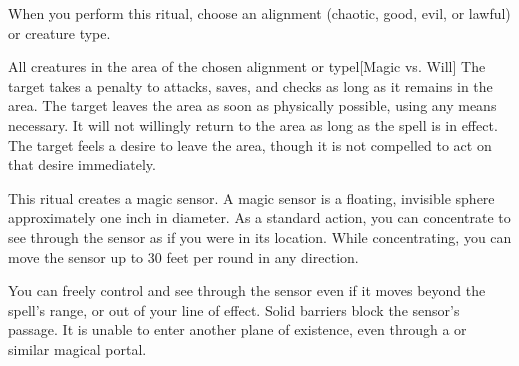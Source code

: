 \spellspecial When you perform this ritual, choose an alignment (chaotic, good, evil, or lawful) or creature type.
\begin{spelltargets}{All creatures in the area of the chosen alignment or type}l[Magic vs. Will]
    \spelleffect The target takes a  penalty to attacks, saves, and checks as long as it remains in the area.
    \spellsuccess The target leaves the area as soon as physically possible, using any means necessary. It will not willingly return to the area as long as the spell is in effect.
    \spellfailure The target feels a desire to leave the area, though it is not compelled to act on that desire immediately.
\end{spelltargets}

\spellrng{\rngmed}
\spelldur{\durlong \dismissable}
\spellline
\spelleffect This ritual creates a magic sensor. A magic sensor is a floating, invisible sphere approximately one inch in diameter. As a standard action, you can concentrate to see through the sensor as if you were in its location. While concentrating, you can move the sensor up to 30 feet per round in any direction.

You can freely control and see through the sensor even if it moves beyond the spell's range, or out of your line of effect.
\spellnotes Solid barriers block the sensor's passage. It is unable to enter another plane of existence, even through a  or similar magical portal.

